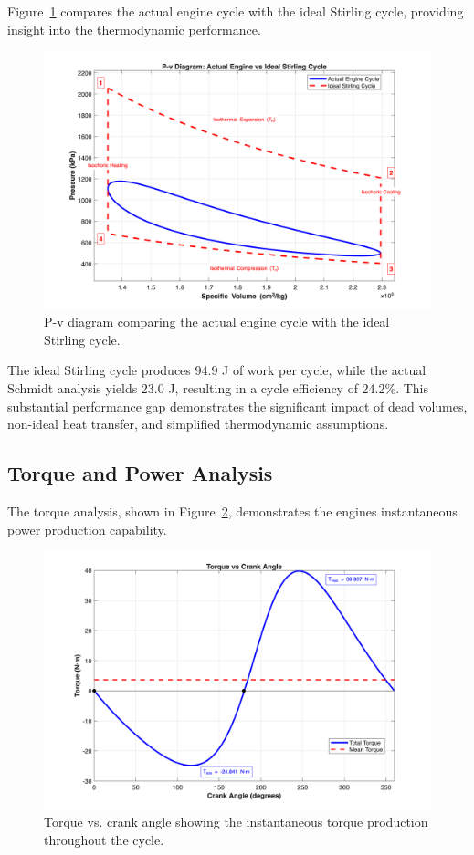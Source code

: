 \documentclass[12pt]{article}
\begin{document}
Figure~\ref{fig:pv_diagram} compares the actual engine cycle with the ideal Stirling cycle, providing insight into the thermodynamic performance.

\begin{figure}[htbp]
  \centering
  \includegraphics[width=0.8\linewidth]{../pv_diagram.png}
  \caption{P-v diagram comparing the actual engine cycle with the ideal Stirling cycle.}
  \label{fig:pv_diagram}
\vspace{-6pt}\end{figure}

The ideal Stirling cycle produces 94.9 J of work per cycle, while the actual Schmidt analysis yields 23.0 J, resulting in a cycle efficiency of 24.2\%. This substantial performance gap demonstrates the significant impact of dead volumes, non-ideal heat transfer, and simplified thermodynamic assumptions.

\subsection{Torque and Power Analysis}
The torque analysis, shown in Figure~\ref{fig:torque_angle}, demonstrates the engine\textquotesingle s instantaneous power production capability.

\begin{figure}[htbp]
  \centering
  \includegraphics[width=0.8\linewidth]{../torque_vs_angle.png}
  \caption{Torque vs. crank angle showing the instantaneous torque production throughout the cycle.}
  \label{fig:torque_angle}
\vspace{-6pt}\end{figure}
\end{document}
